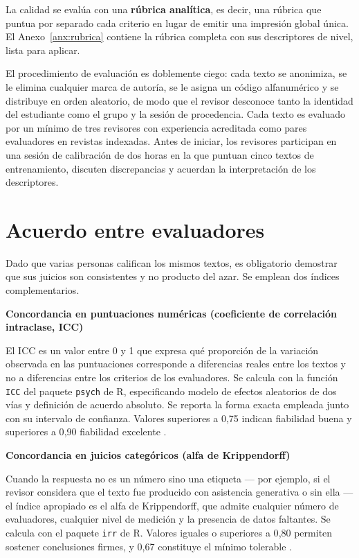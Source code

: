 \documentclass[12pt,a4paper,openany]{report}
\newenvironment{cajaterminos}[1]
{\begin{lrbox}{\cajaguardada}\begin{minipage}{\dimexpr\textwidth-2\fboxsep\relax}\vspace{3pt}\textbf{\sffamily\small #1}\par\vspace{3pt}\small}
        {\vspace{3pt}\end{minipage}\end{lrbox}\par\vspace{4pt}\noindent\colorbox{grisclaro}{\usebox{\cajaguardada}}\par\vspace{8pt}}
\begin{document}
    La calidad se eval\'ua con una \textbf{r\'ubrica anal\'itica}, es decir, una r\'ubrica que puntua por separado cada criterio en lugar de emitir una impresi\'on global \'unica. El Anexo~\ref{anx:rubrica} contiene la r\'ubrica completa con sus descriptores de nivel, lista para aplicar.
    
    El procedimiento de evaluaci\'on es doblemente ciego: cada texto se anonimiza, se le elimina cualquier marca de autor\'ia, se le asigna un c\'odigo alfanum\'erico y se distribuye en orden aleatorio, de modo que el revisor desconoce tanto la identidad del estudiante como el grupo y la sesi\'on de procedencia. Cada texto es evaluado por un m\'inimo de tres revisores con experiencia acreditada como pares evaluadores en revistas indexadas. Antes de iniciar, los revisores participan en una sesi\'on de calibraci\'on de dos horas en la que puntuan cinco textos de entrenamiento, discuten discrepancias y acuerdan la interpretaci\'on de los descriptores.
    
    \section{Acuerdo entre evaluadores}
    
    Dado que varias personas califican los mismos textos, es obligatorio demostrar que sus juicios son consistentes y no producto del azar. Se emplean dos \'indices complementarios.
    
    \begin{cajaterminos}{Concordancia en puntuaciones num\'ericas (coeficiente de correlaci\'on intraclase, ICC)}
        El ICC es un valor entre 0 y 1 que expresa qu\'e proporci\'on de la variaci\'on observada en las puntuaciones corresponde a diferencias reales entre los textos y no a diferencias entre los criterios de los evaluadores. Se calcula con la funci\'on \texttt{ICC} del paquete \texttt{psych} de R, especificando modelo de efectos aleatorios de dos v\'ias y definici\'on de acuerdo absoluto. Se reporta la forma exacta empleada junto con su intervalo de confianza. Valores superiores a 0{,}75 indican fiabilidad buena y superiores a 0{,}90 fiabilidad excelente \citep{koo2016guideline}.
    \end{cajaterminos}
    
    \begin{cajaterminos}{Concordancia en juicios categ\'oricos (alfa de Krippendorff)}
        Cuando la respuesta no es un n\'umero sino una etiqueta --- por ejemplo, si el revisor considera que el texto fue producido con asistencia generativa o sin ella --- el \'indice apropiado es el alfa de Krippendorff, que admite cualquier n\'umero de evaluadores, cualquier nivel de medici\'on y la presencia de datos faltantes. Se calcula con el paquete \texttt{irr} de R. Valores iguales o superiores a 0{,}80 permiten sostener conclusiones firmes, y 0{,}67 constituye el m\'inimo tolerable \citep{hayes2007answering}.
    \end{cajaterminos}
    
\end{document}
